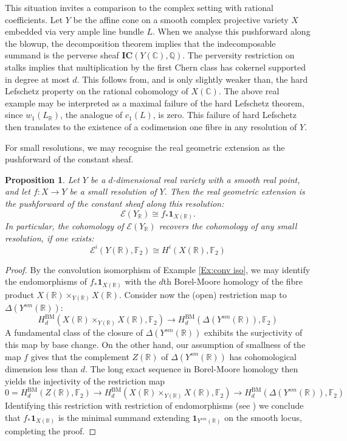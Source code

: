 \documentclass{amsart}
\newtheorem{prop}[thm]{Proposition}
\theoremstyle{definition}
\theoremstyle{remark}
\begin{document}
This situation invites a comparison to the complex setting with rational coefficients. Let $Y$ be the affine cone on a smooth complex projective variety $X$ embedded via very ample line bundle $L$. When we analyse this pushforward along the blowup, the decomposition theorem implies that the indecomposable summand is the perverse sheaf $\mathbf{IC}(Y(\mathbb{C}),\mathbb{Q})$. The perversity restriction on stalks implies that multiplication by the first Chern class has cokernel supported in degree at most $d$. This follows from, and is only slightly weaker than, the hard Lefschetz property on the rational cohomology of $X(\mathbb{C})$. The above real example may be interpreted as a maximal failure of the hard Lefschetz theorem, since $w_1(L_\mathbb{R})$, the analogue of $c_1(L)$, is zero. This failure of hard Lefschetz then translates to the existence of a codimension one fibre in any resolution of $Y$.

For small resolutions, we may recognise the real geometric extension as the pushforward of the constant sheaf.

\begin{prop}\label{Prop:Small resolutions}
Let $Y$ be a $d$-dimensional real variety with a smooth real point, and let $f:X\to Y$ be a small resolution of $Y$. Then the real geometric extension is the pushforward of the constant sheaf along this resolution: \[\mathscr{E}(Y_\mathbb{R})\cong f_*\mathbf{1}_{X(\mathbb{R})}.\]
In particular, the cohomology of $\mathscr{E}(Y_\mathbb{R})$ recovers the cohomology of \emph{any} small resolution, if one exists:
\[\mathscr{E}^i(Y(\mathbb{R}),\mathbb{F}_2)\cong H^i(X(\mathbb{R}),\mathbb{F}_2)\]
\end{prop}

\begin{proof}
By the convolution isomorphism of Example \ref{Ex:conv iso}, we may identify the endomorphisms of $f_*\mathbf{1}_{X(\mathbb{R})}$ with the $d$th Borel-Moore homology of the fibre product $X(\mathbb{R})\times_{Y(\mathbb{R})}X(\mathbb{R})$. Consider now the (open) restriction map to $\Delta(Y^{sm}(\mathbb{R}))$:
 \[H^{\mathrm{BM}}_d(X(\mathbb{R})\times_{Y(\mathbb{R})}X(\mathbb{R}),\mathbb{F}_2)\to H^{\mathrm{BM}}_d(\Delta(Y^{sm}(\mathbb{R})),\mathbb{F}_2)\]
A fundamental class of the closure of $\Delta(Y^{sm}(\mathbb{R}))$ exhibits the surjectivity of this map by base change. On the other hand, our assumption of smallness of the map $f$ gives that the complement $Z(\mathbb{R})$ of $\Delta(Y^{sm}(\mathbb{R}))$ has cohomological dimension less than $d$. The long exact sequence in Borel-Moore homology then yields the injectivity of the restriction map \[0=H_d^{\mathrm{BM}}(Z(\mathbb{R}),\mathbb{F}_2)\to H^{\mathrm{BM}}_d(X(\mathbb{R})\times_{Y(\mathbb{R})}X(\mathbb{R}),\mathbb{F}_2)\to H^{\mathrm{BM}}_d(\Delta(Y^{sm}(\mathbb{R})),\mathbb{F}_2)\] Identifying this restriction with restriction of endomorphisms (see \cite[\S A]{HoneWilliamson2025}) we conclude that $f_*\mathbf{1}_{X(\mathbb{R})}$ is the minimal summand extending $\mathbf{1}_{Y^{sm}(\mathbb{R})}$ on the smooth locus, completing the proof.
\end{proof}
\end{document}
